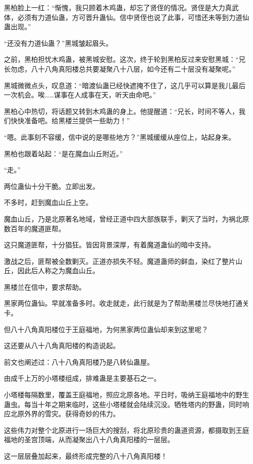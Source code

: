 \begin{this_body}
黑柏脸上一红：“惭愧，我只顾着木鸡蛊，却忘了贤侄的情况。贤侄是大力真武体，必须有力道仙蛊，方可晋升蛊仙。信中贤侄也说了此事，可惜还未等到力道仙蛊出现。”

“还没有力道仙蛊？”黑城皱起眉头。

之前，黑柏担忧木鸡蛊，被黑城安慰。这次，终于轮到黑柏反过来安慰黑城：“兄长勿虑，八十八角真阳楼总共要凝聚八十八层，如今还有二十层没有凝聚呢。”

黑城微微点头，叹息道：“暗渡仙蛊已经快遮掩不住了，这几乎可以算是我儿最后一次机会。唉……谋事在人成事在天，听天由命吧。”

黑柏心中热切，将话题又转到木鸡蛊的身上。他提醒道：“兄长，时间不等人，我们快快准备吧。给黑楼兰提供一些助力！”

“嗯。此事刻不容缓，信中说的是哪些地方？”黑城缓缓从座位上，站起身来。

黑柏也跟着站起：“是在魔血山丘附近。”

“走。”

两位蛊仙十分干脆。立即出发。

不多时，赶到魔血山丘上空。

魔血山丘，乃是北原著名地域，曾经正道中四大部族联手，剿灭了当时，为祸北原数百年的魔道匪帮。

这只魔道匪帮，十分猖狂。皆因背景深厚，有着魔道蛊仙的暗中支持。

激战之后，匪帮被全数剿灭。正道亦损失不轻。魔道蛊师的鲜血，染红了整片山丘，因此后人称之为魔血山丘。

黑楼兰在信中，要求帮助。

黑家两位蛊仙。早就准备多时。收走就走，此行就是为了帮助黑楼兰尽快地打通关卡。

但八十八角真阳楼位于王庭福地，为何黑家两位蛊仙却来到这里呢？

这还要从八十八角真阳楼的构造说起。

前文也阐述过：八十八角真阳楼乃是八转仙蛊屋。

由成千上万的小塔楼组成，排难蛊是主要基石之一。

小塔楼每隔数里，覆盖王庭福地，照应北原各地。平日时，吸纳王庭福地中的野生蛊虫。每当十年之期来临时，这些小塔楼就会陆续沉没。牺牲塔内的野蛊，同时响应北原外界的雪灾。获得奇妙的伟力。

这些伟力对整个北原进行一场巨大的搜刮，将北原珍贵的蛊道资源，都摄取到王庭福地的圣宫顶端，从而凝聚出八十八角真阳楼的一层层。

这一层层叠加起来，最终形成完整的八十八角真阳楼！


\end{this_body}
